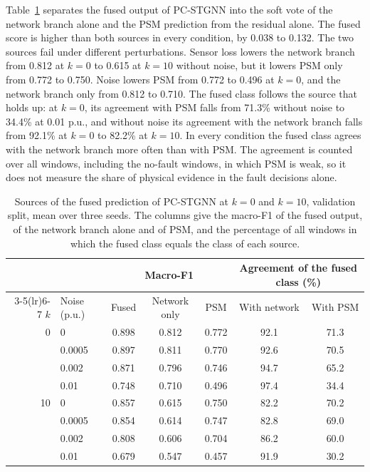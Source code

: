 \documentclass[MTech]{ugthesis}
\begin{document}
Table~\ref{tab:decomp} separates the fused output of \ac{PC-STGNN} into the soft vote of the network branch alone and the \ac{PSM} prediction from the residual alone. The fused score is higher than both sources in every condition, by 0.038 to 0.132. The two sources fail under different perturbations. Sensor loss lowers the network branch from 0.812 at $k=0$ to 0.615 at $k=10$ without noise, but it lowers \ac{PSM} only from 0.772 to 0.750. Noise lowers \ac{PSM} from 0.772 to 0.496 at $k=0$, and the network branch only from 0.812 to 0.710. The fused class follows the source that holds up: at $k=0$, its agreement with \ac{PSM} falls from 71.3\% without noise to 34.4\% at 0.01 p.u., and without noise its agreement with the network branch falls from 92.1\% at $k=0$ to 82.2\% at $k=10$. In every condition the fused class agrees with the network branch more often than with \ac{PSM}. The agreement is counted over all windows, including the no-fault windows, in which \ac{PSM} is weak, so it does not measure the share of physical evidence in the fault decisions alone.

\begin{table}[htbp]
\caption{Sources of the fused prediction of \acs{PC-STGNN} at $k=0$ and $k=10$, validation split, mean over three seeds. The columns give the macro-F1 of the fused output, of the network branch alone and of \acs{PSM}, and the percentage of all windows in which the fused class equals the class of each source.}
\label{tab:decomp}
\footnotesize
\centering
\begin{tabular}{@{}rlccccc@{}}
\toprule
 & & \multicolumn{3}{c}{Macro-F1} & \multicolumn{2}{c}{Agreement of the fused class (\%)} \\
\cmidrule(lr){3-5}\cmidrule(lr){6-7}
$k$ & Noise (p.u.) & Fused & Network only & \acs{PSM} & With network & With \acs{PSM} \\
\midrule
0 & 0 & 0.898 & 0.812 & 0.772 & 92.1 & 71.3 \\
 & 0.0005 & 0.897 & 0.811 & 0.770 & 92.6 & 70.5 \\
 & 0.002 & 0.871 & 0.796 & 0.746 & 94.7 & 65.2 \\
 & 0.01 & 0.748 & 0.710 & 0.496 & 97.4 & 34.4 \\
\addlinespace

10 & 0 & 0.857 & 0.615 & 0.750 & 82.2 & 70.2 \\
 & 0.0005 & 0.854 & 0.614 & 0.747 & 82.8 & 69.0 \\
 & 0.002 & 0.808 & 0.606 & 0.704 & 86.2 & 60.0 \\
 & 0.01 & 0.679 & 0.547 & 0.457 & 91.9 & 30.2 \\
\bottomrule
\end{tabular}
\end{table}
\end{document}
